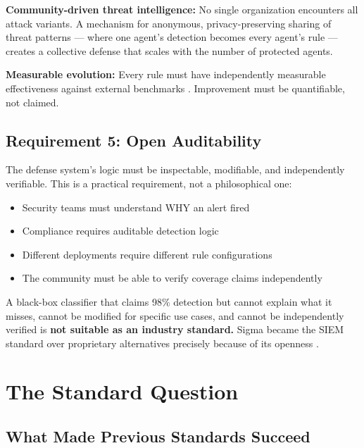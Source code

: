 \documentclass[11pt,letterpaper]{article}
\begin{document}
\textbf{Community-driven threat intelligence:} No single organization encounters all attack variants. A mechanism for anonymous, privacy-preserving sharing of threat patterns --- where one agent's detection becomes every agent's rule --- creates a collective defense that scales with the number of protected agents.

\textbf{Measurable evolution:} Every rule must have independently measurable effectiveness against external benchmarks \cite{pint}. Improvement must be quantifiable, not claimed.

\subsection{Requirement 5: Open Auditability}

The defense system's logic must be inspectable, modifiable, and independently verifiable. This is a practical requirement, not a philosophical one:

\begin{itemize}
\item Security teams must understand WHY an alert fired
\item Compliance requires auditable detection logic
\item Different deployments require different rule configurations
\item The community must be able to verify coverage claims independently
\end{itemize}

A black-box classifier that claims 98\% detection but cannot explain what it misses, cannot be modified for specific use cases, and cannot be independently verified is \textbf{not suitable as an industry standard.} Sigma became the SIEM standard over proprietary alternatives precisely because of its openness \cite{sigma}.


\section{The Standard Question}
\label{sec:standard}

\subsection{What Made Previous Standards Succeed}
\end{document}
